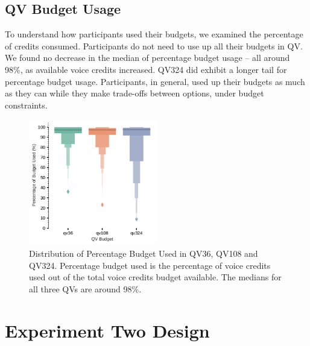 \subsection{QV Budget Usage}
To understand how participants used their budgets, we examined the percentage of credits consumed. Participants do not need to use up all their budgets in QV. We found no decrease in the median of percentage budget usage -- all around 98\%, as available voice credits increased. QV324 did exhibit a longer tail for percentage budget usage. Participants, in general, used up their budgets as much as they can while they make trade-offs between options, under budget constraints.
\begin{figure}[htpb]
    \centering
    \includegraphics[width=0.5\textwidth, keepaspectratio=true]{content/image/qv_budget_used_distribution.pdf}
    \caption{
      Distribution of Percentage Budget Used in QV36, QV108 and QV324. Percentage budget used is the percentage of voice credits used out of the total voice credits budget available. The medians for all three QVs are around 98\%.
    }
    \label{fig:qv_budget_exp1}
\end{figure}


\section{Experiment Two Design}
